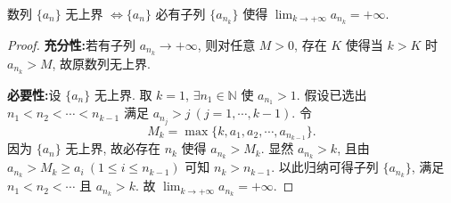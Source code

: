 \begin{example}\label{ex:1.1.16}
数列 $\{a_{n}\}$ 无上界 $\iff \{a_{n}\}$ 必有子列 $\{a_{n_{k}}\}$ 使得 $\lim_{k\to+\infty}a_{n_k}=+\infty$.
\end{example}
\begin{proof}
\textbf{充分性:}\quad 若有子列 $a_{n_k}\to+\infty$, 则对任意 $M>0$, 存在 $K$ 使得当 $k>K$ 时 $a_{n_k}>M$, 故原数列无上界.

\textbf{必要性:}\quad 设 $\{a_n\}$ 无上界. 取 $k=1$, $\exists n_1\in\mathbb{N}$ 使 $a_{n_1}>1$.
假设已选出 $n_1<n_2<\cdots<n_{k-1}$ 满足 $a_{n_j}>j\ (j=1,\cdots,k-1)$. 令
\[
  M_k = \max\{k, a_1, a_2, \cdots, a_{n_{k-1}}\}.
\]
因为 $\{a_n\}$ 无上界, 故必存在 $n_k$ 使得 $a_{n_k}>M_k$. 显然 $a_{n_k}>k$, 且由 $a_{n_k}>M_k \geqslant a_i\ (1\leqslant i\leqslant n_{k-1})$ 可知 $n_k > n_{k-1}$.
以此归纳可得子列 $\{a_{n_k}\}$, 满足 $n_1<n_2<\cdots$ 且 $a_{n_k}>k$. 故 $\lim_{k\to+\infty}a_{n_k}=+\infty$.
\end{proof}

